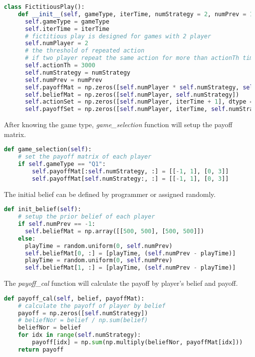 \documentclass[a4paper, oneside, final, 12pt]{scrartcl} %
\begin{document}
\begin{lstlisting}[language=Python]
  class FictitiousPlay():
    def __init__(self, gameType, iterTime, numStrategy = 2, numPrev = 1000):
      self.gameType = gameType
      self.iterTime = iterTime
      # fictitious play is designed for games with 2 player
      self.numPlayer = 2
      # the threshold of repeated action
      # if two player repeat the same action for more than actionTh times, stop the iteration
      self.actionTh = 3000
      self.numStrategy = numStrategy
      self.numPrev = numPrev
      self.payoffMat = np.zeros([self.numPlayer * self.numStrategy, self.numStrategy])
      self.beliefMat = np.zeros([self.numPlayer, self.numStrategy])
      self.actionSet = np.zeros([self.numPlayer, iterTime + 1], dtype = np.uint8)
      self.payoffSet = np.zeros([self.numPlayer, iterTime, self.numStrategy])
\end{lstlisting}

After knowing the game type, \emph{game\_selection} function will setup the payoff matrix.

\begin{lstlisting}[language=Python]
  def game_selection(self):
    # set the payoff matrix of each player
    if self.gameType == "Q1":
        self.payoffMat[:self.numStrategy, :] = [[-1, 1], [0, 3]]
        self.payoffMat[self.numStrategy:, :] = [[-1, 1], [0, 3]]
\end{lstlisting}

\newpage

The initial belief can be defined by programmer or assigned randomly.

\begin{lstlisting}[language=Python]
  def init_belief(self):
    # setup the prior belief of each player
    if self.numPrev == -1:
      self.beliefMat = np.array([[500, 500], [500, 500]])
    else:
      playTime = random.uniform(0, self.numPrev)
      self.beliefMat[0, :] = [playTime, (self.numPrev - playTime)]
      playTime = random.uniform(0, self.numPrev)
      self.beliefMat[1, :] = [playTime, (self.numPrev - playTime)]
\end{lstlisting}

The \emph{payoff\_cal} function will calculate the payoff by player's belief and payoff.

\begin{lstlisting}[language=Python]
  def payoff_cal(self, belief, payoffMat):
    # calculate the payoff of player by belief
    payoff = np.zeros([self.numStrategy])
    # beliefNor = belief / np.sum(belief)
    beliefNor = belief
    for idx in range(self.numStrategy):
        payoff[idx] = np.sum(np.multiply(beliefNor, payoffMat[idx]))
    return payoff
\end{lstlisting}
\end{document}
